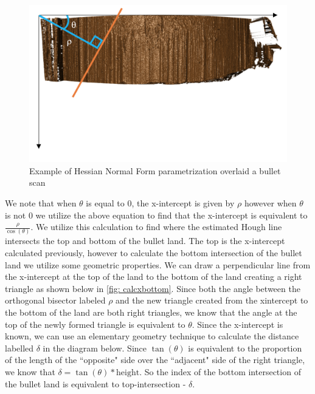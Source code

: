 \documentclass[12pt]{article}
\theoremstyle{nonumberplain}
\begin{document}
\begin{figure}[ht!]
  \centering
  \includegraphics{../images/hessian-example.png}
  \caption{Example of Hessian Normal Form parametrization overlaid a bullet scan}
  \label{fig: parametrization}
\end{figure}

We note that when $\theta$ is equal to 0, the x-intercept is given by $\rho$ however when $\theta$ is not 0 we utilize the above equation to find that the x-intercept is equivalent to $\frac{\rho}{\cos(\theta)}$.  We utilize this calculation to find where the estimated Hough line intersects the top and bottom of the bullet land. The top is the x-intercept calculated previously, however to calculate the bottom intersection of the bullet land we utilize some geometric properties. We can draw a perpendicular line from the x-intercept at the top of the land to the bottom of the land creating a right triangle as shown below in \ref{fig: calcxbottom}. Since both the angle between the orthogonal bisector labeled $\rho$ and the new triangle created from the xintercept to the bottom of the land are both right triangles, we know that the angle at the top of the newly formed triangle is equivalent to $\theta$. Since the x-intercept is known, we can use an elementary geometry technique to calculate the distance labelled $\delta$ in the diagram below. Since $\tan(\theta)$ is equivalent to the proportion of the length of the ``opposite" side over the ``adjacent" side of the right triangle, we know that $\delta = \tan(\theta)*\text{height}$. So the index of the bottom intersection of the bullet land is equivalent to top-intersection - $\delta$. 
\end{document}
